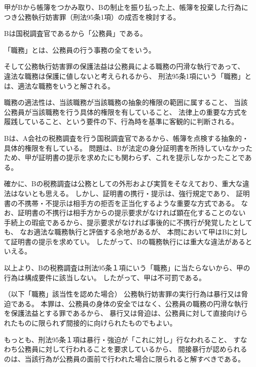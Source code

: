 \documentclass[11pt]{jsarticle}
\title{\vspace{-30mm}{\textgt{\Large{\fbox{11} 帳簿の紙吹雪}}}}
\date{\vspace{-15mm}}
\begin{document}
\maketitle

\sectionB{}
	甲がBから帳簿をつかみ取り、Bの制止を振り払った上、帳簿を投棄した行為につき公務執行妨害罪（刑法95条1項）の成否を検討する。
	
	\sectionC{}
		Bは国税調査官であるから「公務員」である。
		
	\sectionC{}
		「職務」とは、公務員の行う事務の全てをいう。
		
		そして公務執行妨害罪の保護法益は公務員による職務の円滑な執行であって、
		違法な職務は保護に値しないと考えられるから、
		刑法95条1項にいう「職務」とは、適法な職務をいうと解される。
		
		職務の適法性は、当該職務が当該職務の抽象的権限の範囲に属すること、
		当該公務員が当該職務を行う具体的権限を有していること、
		法律上の重要な方式を履践していること、という要件の下、行為時を基準に客観的に判断される。
		
		Bは、A会社の税務調査を行う国税調査官であるから、帳簿を点検する抽象的・具体的権限を有している。
		問題は、Bが法定の身分証明書を所持していなかったため、甲が証明書の提示を求めたにも関わらず、これを提示しなかったことである。
		
		確かに、Bの税務調査は公務としての外形および実質をそなえており、重大な違法はないとも思える。
		しかし、証明書の携行・提示は、強行規定であり、
		証明書の不携帯・不提示は相手方の拒否を正当化するような重要な方式である。
		なお、証明書の不携行は相手方からの提示要求がなければ顕在化することのない
		手続上の瑕疵であるから、提示要求がなければ事後的に不携行が発覚したとしても、
		なお適法な職務執行と評価する余地があるが、
		本問において甲はBに対して証明書の提示を求めてい。
		したがって、Bの職務執行には重大な違法があるといえる。
		
		以上より、Bの税務調査は刑法95条１項にいう「職務」に当たらないから、甲の行為は構成要件に該当しない。
		したがって、甲は不可罰である。
		
\dotfill		
		
	\sectionC{}
		（以下「職務」該当性を認めた場合）
		公務執行妨害罪の実行行為は暴行又は脅迫である。
		本罪は、公務員の身体の安全ではなく、公務員の職務の円滑な執行を保護法益とする罪であるから、
		暴行又は脅迫は、公務員に対して直接向けられたものに限られず間接的に向けられたものでもよい。
		
		もっとも、刑法95条１項は暴行・強迫が「これに対し」行なわれること、
		すなわち公務員に対して行われることを要求しているから、
		間接暴行が認められるのは、当該行為が公務員の面前で行われた場合に限られると解すべきである。
		
\end{document}
